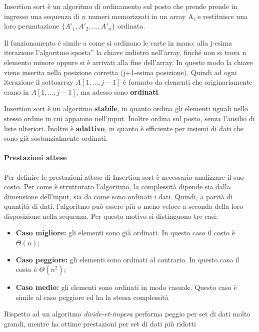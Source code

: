 \documentclass[
]{article}
\begin{document}
Insertion sort è un algoritmo di ordinamento sul posto che prende prende
in ingresso una sequenza di \(n\) numeri memorizzati in un array A, e
restituisce una loro permutazione
\(\{A'_{1}, A'_{2}, \dotsc , A'_{n} \}\) ordinata.

Il funzionamento è simile a come si ordinano le carte in mano: alla
j-esima iterazione l'algoritmo sposta'' la chiave indietro nell'array,
finché non si trova n elemento minore oppure si è arrivati alla fine
dell'array. In questo modo la chiave viene inserita nella posizione
corretta (j+1-esima posizione). Quindi ad ogni iterazione il sottoarray
\(A[1, \dotsc, j-1]\) è formato da elementi che originariamente erano in
\(A[1, \dotsc, j-1]\), ma adesso sono \textbf{ordinati}.

Insertion sort è un algoritmo \textbf{stabile}, in quanto ordina gli
elementi uguali nello stesso ordine in cui appaiono nell'input. Inoltre
ordina sul posto, senza l'ausilio di liste ulteriori. Inoltre è
\textbf{adattivo}, in quanto è efficiente per insiemi di dati che sono
già sostanzialmente ordinati.

\hypertarget{prestazioni-attese}{%
\paragraph{Prestazioni attese}\label{prestazioni-attese}}

Per definire le prestazioni attese di Insertion sort è necessario
analizzare il suo costo. Per come è strutturato l'algoritmo, la
complessità dipende sia dalla dimensione dell'input, sia da come sono
ordinati i dati. Quindi, a parità di quantità di dati, l'algoritmo può
essere più o meno veloce a seconda della loro disposizione nella
sequenza. Per questo motivo si distinguono tre casi:

\begin{itemize}
\item
  \textbf{Caso migliore:} gli elementi sono già ordinati. In questo caso
  il costo è \(\Theta(n)\);
\item
  \textbf{Caso peggiore:} gli elementi sono ordinati al contrario. In
  questo caso il costo è \(\Theta(n^{2})\);
\item
  \textbf{Caso medio:} gli elementi sono ordinati in modo casuale.
  Questo caso è simile al caso peggiore ed ha la stessa complessità
\end{itemize}

Rispetto ad un algoritmo \emph{divide-et-impera} performa peggio per set
di dati molto grandi, mentre ha ottime prestazioni per set di dati più
ridotti
\end{document}
